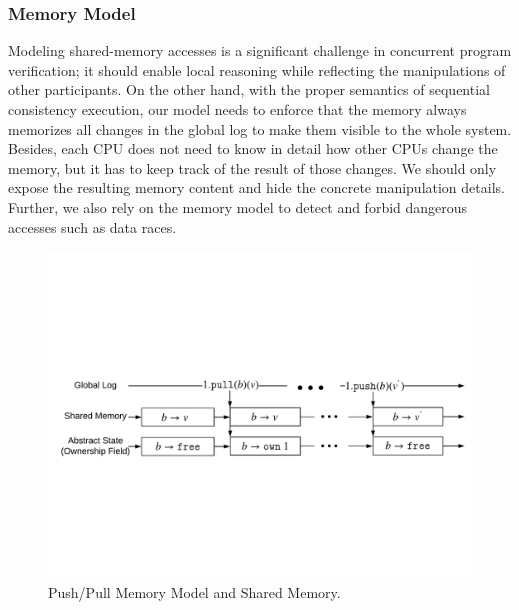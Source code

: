 \subsubsection{Memory Model}

Modeling shared-memory accesses is
a significant challenge in concurrent program verification;
it should enable local reasoning while reflecting the manipulations of other participants.
On the other hand, 
with the proper semantics of sequential consistency execution,
our model needs to enforce that the memory always memorizes all changes in the global log to make them visible to the whole system.
Besides,   
each CPU does not need to know in detail how other CPUs 
change the memory, but it has to keep track of the result of those changes.
We should  only expose the resulting memory 
content and hide the concrete manipulation details.
Further, we also rely on the memory model
to detect and forbid dangerous accesses such as data races.


\begin{figure}
\includegraphics[width=\textwidth]{figs/ccal/pushpullsharedmemory}
\caption{Push/Pull Memory Model and Shared Memory.}
\label{fig:chapter:ccal:push-pull-memory-model-and-shared-memory}
\end{figure}

